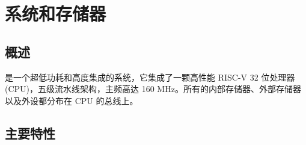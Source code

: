 \documentclass[main\_\_CN.tex]{subfiles}
\begin{document}

\ifglobal
\else
    \listoftodos
    {\let\clearpage\relax \listofdonetodos}
    \tableofcontents
\fi


\hypertarget{sysmem}{}
\chapter{系统和存储器}
\label{mod:sysmem}

\section{概述}

\chipname{} 是一个超低功耗和高度集成的系统，它集成了一颗高性能 RISC-V 32 位处理器 (CPU)，五级流水线架构，主频高达 160 MHz。所有的内部存储器、外部存储器以及外设都分布在 CPU 的总线上。

\section{主要特性}
\end{document}
